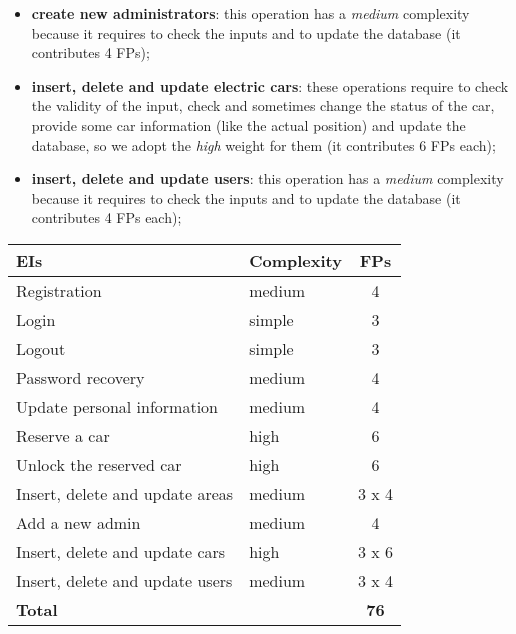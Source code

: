\begin{itemize}
\begin{itemize}
			\item \textbf{create new administrators}: this operation has a \textit{medium} complexity because it requires to check the inputs and to update the database (it contributes 4 FPs);
			\item \textbf{insert, delete and update electric cars}: these operations require to check the validity of the input, check and sometimes change the status of the car, provide some car information (like the actual position) and update the database, so we adopt the \textit{high} weight for them (it contributes 6 FPs each);
			\item \textbf{insert, delete and update users}: this operation has a \textit{medium} complexity because it requires to check the inputs and to update the database (it contributes 4 FPs each);
		\end{itemize}
\end{itemize}

\begin{center}
	\begin{tabular}{|l|l|c|}
		\hline
		\textbf{EIs} 	& \textbf{Complexity} 	& \textbf{FPs} \\
		\hline
		Registration 	& medium 	& 4 \\
		Login 	& simple 	& 3 \\
		Logout 	& simple 	& 3 \\
		Password recovery 	& medium 	& 4 \\
		Update personal information 	& medium 	& 4 \\
		Reserve a car 	& high 	& 6 \\
		Unlock the reserved car 	& high 	& 6 \\
		Insert, delete and update areas 	& medium 	& 3 x 4 \\
		Add a new admin 	& medium 	& 4 \\
		Insert, delete and update cars 	& high 	& 3 x 6 \\
		Insert, delete and update users 	& medium 	& 3 x 4 \\		
		\hline \hline
		\textbf{Total} 	& 	& \textbf{76} \\
		\hline
	\end{tabular}
\end{center}

